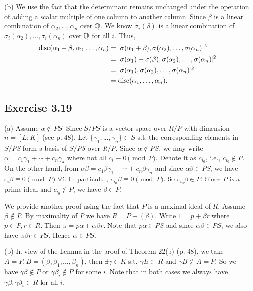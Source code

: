 \documentclass[../Marcus.tex]{subfiles}
\begin{document}
(b) We use the fact that the determinant remains unchanged under the operation of adding a scalar multiple of one column to another column. Since $\beta$ is a linear combination of $\alpha_2,\ldots,\alpha_n$ over $\mathbb{Q}$. We know $\sigma_i(\beta)$ is a linear combination of $\sigma_i(\alpha_2),\ldots,\sigma_i(\alpha_n)$ over $\mathbb{Q}$ for all $i$. Thus,
\begin{align*}
    \operatorname{disc}(\alpha_1+\beta,\alpha_2,\ldots,\alpha_n) &= |\sigma(\alpha_1+\beta),\sigma(\alpha_2),\ldots,\sigma(\alpha_n)|^2 \\
    &=|\sigma(\alpha_1)+\sigma(\beta),\sigma(\alpha_2),\ldots,\sigma(\alpha_n)|^2  \\
    &= |\sigma(\alpha_1),\sigma(\alpha_2),\ldots,\sigma(\alpha_n)|^2 \\
    &= \operatorname{disc}(\alpha_1,\ldots,\alpha_n).
\end{align*}

\subsection*{Exercise 3.19}

(a) Assume $\alpha\notin PS$. Since $S/PS$ is a vector space over $R/P$ with dimension $n=[L:K]$ (see p. 48). Let $\{\gamma_1,\ldots,\gamma_n\}\subset S$ s.t. the corresponding elements in $S/PS$ form a basis of $S/PS$ over $R/P$. Since $\alpha\notin PS$, we may write $\alpha=c_1\gamma_1+\cdots+c_n\gamma_n$ where not all $c_i \equiv 0 \pmod{P}$. Denote it as $c_{i_0}$, i.e., $c_{i_0}\notin P$. On the other hand, from $\alpha\beta=c_1\beta\gamma_1+\cdots+c_n\beta\gamma_n$ and since $\alpha\beta\in PS$, we have $c_i\beta \equiv 0 \pmod{P}$ $\forall i$. In particular, $c_{i_0}\beta\equiv 0 \pmod{P}$. So $c_{i_0}\beta\in P$. Since $P$ is a prime ideal and $c_{i_0}\notin P$, we have $\beta\in P$.

We provide another proof using the fact that $P$ is a maximal ideal of $R$. Assume $\beta\notin P$. By maximality of $P$ we have $R=P+(\beta)$. Write $1=p+\beta r$ where $p\in P,r\in R$. Then $\alpha=p \alpha+\alpha\beta r$. Note that $p\alpha\in PS$ and since $\alpha\beta\in PS$, we also have $\alpha\beta r\in PS$. Hence $\alpha\in PS$.

(b) In view of the Lemma in the proof of Theorem 22(b) (p. 48), we take $A=P,B=(\beta,\beta_1,\ldots,\beta_n)$, then $\exists\gamma\in K$ s.t. $\gamma B\subset R$ and $\gamma B \not\subset A=P$. So we have $\gamma\beta\notin P$ or $\gamma\beta_i\notin P$ for some $i$. Note that in both cases we always have $\gamma\beta,\gamma\beta_i \in R$ for all $i$.
\end{document}
